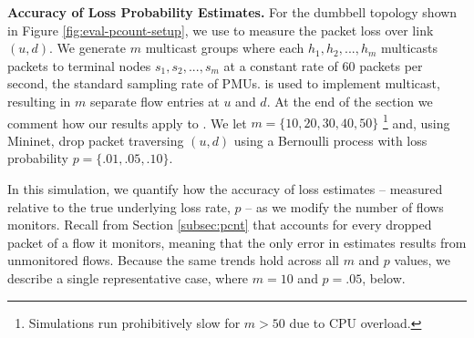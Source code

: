 
{\bf Accuracy of Loss Probability Estimates.}
For the dumbbell topology shown in Figure \ref{fig:eval-pcount-setup}, we use \pcnt to measure the packet loss over link $(u,d)$.  We generate $m$ multicast groups
where each $h_1,h_2, ..., h_m$ multicasts packets to terminal nodes $s_1, s_2, ..., s_m$ at a constant rate of $60$ packets per second, the standard sampling rate of PMUs.  \base is used
to implement multicast, resulting in $m$ separate flow entries at $u$ and $d$.  At the end of the section we comment how our results apply to \merges. We let $m=\{10,20,30,40,50\}$
\footnote{Simulations run prohibitively slow for $m>50$ due to CPU overload.} %
and, using Mininet, drop packet traversing $(u,d)$ using a Bernoulli process with loss probability $p=\{.01,.05,.10\}$.  

In this simulation, we quantify how the accuracy of \pcnt loss estimates -- measured relative to the true underlying loss rate, $p$ -- as we modify the number of flows \pcnt monitors. 
Recall from Section \ref{subsec:pcnt} that \pcnt accounts for every dropped packet of a flow it monitors, meaning that the only error in \pcnt estimates results from unmonitored flows.
Because the same trends hold across all $m$ and $p$ values, we describe a single representative case, where $m=10$ and $p=.05$, below.


